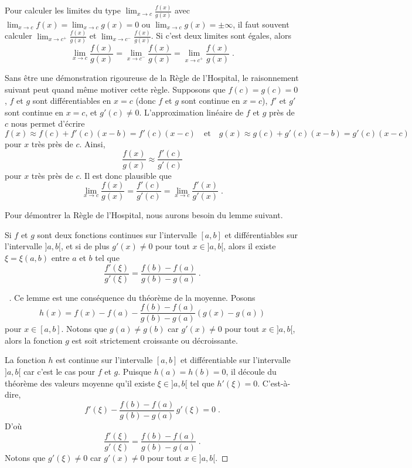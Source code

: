 {\begin{rmk}
Pour calculer les limites du type
$\displaystyle \lim_{x\rightarrow c} \frac{f(x)}{g(x)}$ avec
$\displaystyle \lim_{x\rightarrow c} f(x) = \lim_{x\rightarrow c} g(x) = 0$
ou $\displaystyle \lim_{x\rightarrow c} g(x) = \pm \infty$, il faut
souvent calculer
$\displaystyle \lim_{x\rightarrow c^+} \frac{f(x)}{g(x)}$
et $\displaystyle \lim_{x\rightarrow c^-} \frac{f(x)}{g(x)}$.  Si
c'est deux limites sont égales, alors
\[
\lim_{x\rightarrow c} \frac{f(x)}{g(x)} =
\lim_{x\rightarrow c^-} \frac{f(x)}{g(x)} =
\lim_{x\rightarrow c^+} \frac{f(x)}{g(x)} \; .
\]
\end{rmk}

Sans être une démonstration rigoureuse de la Règle de l'Hospital, le
raisonnement suivant peut quand même motiver cette règle.  Supposons
que $f(c)=g(c)=0$, $f$ et $g$ sont différentiables en $x=c$ (donc $f$
et $g$ sont continue en $x=c$), $f'$ et $g'$ sont continue
en $x=c$, et $g'(c)\neq 0$.  L'approximation linéaire de $f$ et $g$
près de $c$ nous permet d'écrire
\[
f(x) \approx f(c) + f'(c)(x-b) = f'(c) (x-c) \quad \text{et} \quad
g(x) \approx g(c) + g'(c)(x-b) = g'(c) (x-c)
\]
pour $x$ très près de $c$.  Ainsi,
\[
\frac{f(x)}{g(x)} \approx \frac{f'(c)}{g'(c)}
\]
pour $x$ très près de $c$.  Il est donc plausible que
\[
\lim_{x\rightarrow c} \frac{f(x)}{g(x)} = \frac{f'(c)}{g'(c)}
= \lim_{x\rightarrow c} \frac{f'(x)}{g'(x)} \; .
\]

Pour démontrer la Règle de l'Hospital, nous aurons besoin du lemme suivant.

\begin{lemma}
Si $f$ et $g$ sont deux fonctions continues sur l'intervalle $[a,b]$
et différentiables sur l'intervalle $]a,b[$, et si de plus
$g'(x)\neq 0$ pour tout $x\in]a,b[$, alors il existe $\xi = \xi(a,b)$
entre $a$ et $b$ tel que
\[
\frac{f'(\xi)}{g'(\xi)} = \frac{f(b)-f(a)}{g(b)-g(a)} \; .
\]
\end{lemma}

\begin{proof}[\UOproof\ {\theory}]
Ce lemme est une conséquence du théorème de la moyenne.  Posons
\[
h(x) = f(x) - f(a) - \frac{f(b)-f(a)}{g(b)-g(a)}
\left(g(x)-g(a)\right)
\]
pour $x\in[a,b]$.  Notons que $g(a)\neq g(b)$ car $g'(x)\neq 0$ pour
tout $x\in]a,b[$, alors la fonction $g$ est soit strictement
croissante ou décroissante.

La fonction $h$ est continue sur l'intervalle $[a,b]$ et
différentiable sur l'intervalle $]a,b[$ car c'est le cas pour $f$ et
$g$.  Puisque $h(a) = h(b) = 0$, il découle du théorème des valeurs
moyenne qu'il existe $\xi\in ]a,b[$ tel que $h'(\xi)=0$.
C'est-à-dire,
\[
f'(\xi) - \frac{f(b)-f(a)}{g(b)-g(a)} \, g'(\xi) = 0 \; .
\]
D'où
\[
\frac{f'(\xi)}{g'(\xi)} = \frac{f(b)-f(a)}{g(b)-g(a)} \; .
\]
Notons que $g'(\xi) \neq 0$ car $g'(x)\neq 0$ pour tout $x\in]a,b[$.
\end{proof}

}
